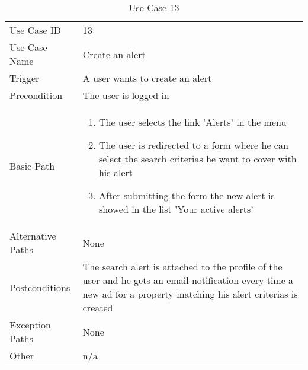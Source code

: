 \begin{table}[H]
\centering
\label{table-use-case-13}
\begin{tabular}{|p{3cm}|p{10cm}}
Use Case ID       & 13                                                         \\
Use Case Name     & Create an alert                                                         \\
Trigger           & A user wants to create an alert                                         \\
Precondition      & The user is logged in                          \\
Basic Path        & \begin{enumerate}
\item The user selects the link 'Alerts' in the menu
\item The user is redirected to a form where he can select the search criterias
he want to cover with his alert
\item After submitting the form the new alert is showed in the list 'Your active alerts'
\end{enumerate} 
     \\
Alternative Paths & None                          \\
Postconditions    & The search alert is attached to the profile of the user and
he gets an email notification every time a new ad for a property matching his
alert criterias is created			\\
Exception Paths   & None				\\
Other             & n/a                                                                                                                                                                                                        
\end{tabular}
\caption{Use Case 13}
\end{table}


